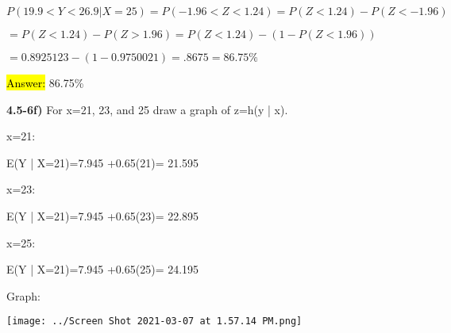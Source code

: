 \documentclass{article}
\begin{document}
$P(19.9 < Y < 26.9 | X=25)=P(-1.96< Z < 1.24 )=P(Z < 1.24)-P(Z <-1.96)$

\vspace{2mm}

$=P(Z < 1.24)-P(Z > 1.96)= P(Z < 1.24)-(1-P(Z < 1.96))$

\vspace{2mm}

$=0.8925123-(1-0.9750021)=.8675=86.75\%$

\vspace{2mm}


\hl{Answer:} 86.75\%

\vspace{4mm}




\textbf{4.5-6f)} For x=21, 23, and 25 draw a graph of z=h(y | x).

\vspace{2mm}


x=21:

E(Y | X=21)=7.945 +0.65(21)= 21.595

\vspace{2mm}


x=23:

E(Y | X=21)=7.945 +0.65(23)= 22.895


\vspace{2mm}


x=25:

E(Y | X=21)=7.945 +0.65(25)= 24.195


\vspace{2mm}

Graph: 


\vspace{2mm}

\texttt{[image: ../Screen Shot 2021-03-07 at 1.57.14 PM.png]}
\end{document}
